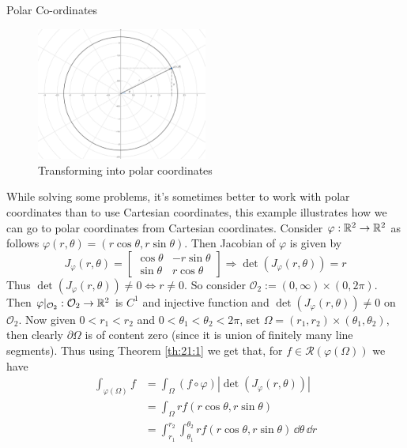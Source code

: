 \documentclass[../Analysis-3.tex]{subfiles}
\begin{document}
\begin{Eg}{Polar Co-ordinates}{}
  \begin{figure}
    \centering
    \includegraphics[width=0.5\textwidth]{../figures/lec21.1.png}
    \caption{Transforming into polar coordinates}
    \label{fig1:21}
  \end{figure}
  While solving some problems, it's sometimes better to work with polar coordinates than to use Cartesian coordinates, this example illustrates how we can go to polar coordinates from Cartesian coordinates.
  Consider $\varphi : \mathbb{R}^2 \to \mathbb{R}^2$ as follows $\varphi(r,\theta) = (r \cos\theta, r \sin\theta)$. Then Jacobian of $\varphi$ is given by
  \[
    J_{\varphi}(r,\theta) = \begin{bmatrix}
      \cos\theta & -r\sin\theta \\
      \sin\theta & r\cos\theta
    \end{bmatrix} \Rightarrow \det(J_{\varphi}(r,\theta)) = r
  \]
  Thus $\det(J_{\varphi}(r,\theta)) \neq 0 \Leftrightarrow r \neq 0$. So consider $\mathcal{O}_2 := (0,\infty) \times (0,2\pi)$. Then $\varphi\vert_{\mathcal{O}_2} : \mathcal{O}_2 \to \mathbb{R}^2$ is $C^1$ and injective function and $\det(J_{\varphi}(r,\theta)) \neq 0 $ on $\mathcal{O}_2$. Now given $0 < r_1 < r_2$ and $0 < \theta_1 < \theta_2 < 2\pi$, set $\Omega = (r_1, r_2) \times (\theta_1, \theta_2)$, then clearly $\partial \Omega$ is of content zero (since it is union of finitely many line segments). Thus using Theorem \ref{th:21:1} we get that, for $f \in \mathscr{R}(\varphi(\Omega))$ we have
  \begin{align*}
    \int_{\varphi(\Omega)} f & = \int_{\Omega} (f \circ \varphi) |\det (J_{\varphi}(r,\theta))|                                 \\
                             & = \int_{\Omega} r f(r\cos\theta, r\sin\theta)                                                    \\
                             & = \int_{r_1}^{r_2} \int_{\theta_1}^{\theta_2} r f(r\cos\theta, r\sin\theta)\, \dd\theta \, \dd r
  \end{align*}


\end{Eg}
\end{document}
